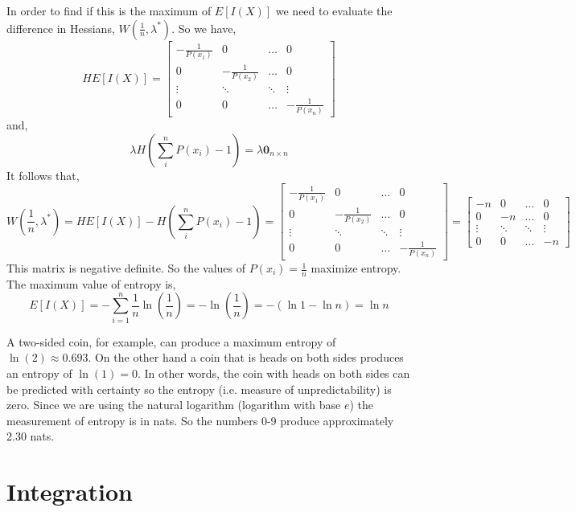 \documentclass[12pt]{article}
\begin{document}
 In order to find if this is the maximum of $E[I(X)]$ we need to evaluate the difference in Hessians, $W(\frac{1}{n},\lambda^*)$. So we have,
\[
HE[I(X)] = 
\begin{bmatrix}
- \frac{1}{P(x_1)} & 0 & \ldots & 0 \\
0 & - \frac{1}{P(x_2)} & \ldots & 0 \\
\vdots & \ddots & \ddots & \vdots \\
0 & 0 & \dots & - \frac{1}{P(x_n)} 
\end{bmatrix}
\]
and,
\[
\lambda H\left(\sum_{i}^{n} P(x_i)-1\right) = \lambda \mathbf{0}_{n\times n}
\]
It follows that,
\[
W\left(\frac{1}{n},\lambda^*\right) = HE[I(X)] - H\left(\sum_{i}^{n} P(x_i)-1\right) = 
\begin{bmatrix}
- \frac{1}{P(x_1)} & 0 & \ldots & 0 \\
0 & - \frac{1}{P(x_2)} & \ldots & 0 \\
\vdots & \ddots & \ddots & \vdots \\
0 & 0 & \dots & - \frac{1}{P(x_n)} 
\end{bmatrix}
=
\begin{bmatrix}
- n & 0 & \ldots & 0 \\
0 & - n & \ldots & 0 \\
\vdots & \ddots & \ddots & \vdots \\
0 & 0 & \dots & - n 
\end{bmatrix}
\]
This matrix is negative definite. So the values of $P(x_i)= \frac{1}{n}$ maximize entropy. The maximum value of entropy is,
\[
E[I(X)] = -\sum_{i=1}^{n} \frac{1}{n} \ln \left(\frac{1}{n}\right) =  - \ln\left(\frac{1}{n}\right) = -( \ln 1 - \ln n ) = \ln n
\]

 A two-sided coin, for example, can produce a maximum entropy of $\ln(2)\approx 0.693$. On the other hand a coin that is heads on both sides produces an entropy of $\ln(1)=0$. In other words, the coin with heads on both sides can be predicted with certainty so the entropy (i.e. measure of unpredictability) is zero. Since we are using the natural logarithm (logarithm with base $e$) the measurement of entropy is in nats. So the numbers 0-9 produce approximately 2.30 nats. \\
 
\pagebreak
\section{Integration}
\end{document}

